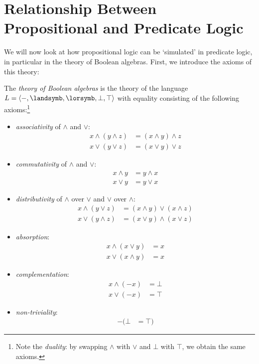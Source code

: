 \section{Relationship Between Propositional and Predicate Logic}
\label{section:relationship-propositional-predicate-logic}

We will now look at how propositional logic can be `simulated' in predicate logic, in particular in the theory of Boolean algebras. First, we introduce the axioms of this theory:

\begin{definition}
    The \emph{theory of Boolean algebras} is the theory of the language $L=\langle -,\landsymb,\lorsymb,\bot,\top\rangle$ with equality consisting of the following axioms:\footnote{Note the \emph{duality}: by swapping $\land$ with $\lor$ and $\bot$ with $\top$, we obtain the same axioms.}
    \begin{multicols}{2}
        \begin{itemize}
            \item \emph{associativity} of $\land$ and $\lor$:
            \begin{align*}
                x\land(y\land z) &=(x\land y)\land z\\
                x\lor(y\lor z) &=(x\lor y)\lor z
            \end{align*}
            \item \emph{commutativity} of $\land$ and $\lor$:
            \begin{align*}
                x\land y &= y\land x\\
                x\lor y &= y\lor x
            \end{align*}
            \item \emph{distributivity} of $\land$ over $\lor$ and $\lor$ over $\land$:
            \begin{align*}
                x\land(y\lor z) &= (x\land y)\lor (x\land z)\\
                x\lor(y\land z) &= (x\lor y)\land (x\lor z)
            \end{align*}
            \item \emph{absorption}:
            \begin{align*}
                x\land(x\lor y) &= x\\
                x\lor(x\land y) &= x
            \end{align*}
            \item \emph{complementation}:
            \begin{align*}
                x\land(-x) &= \bot \\
                x\lor(-x) &= \top
            \end{align*}
            \item \emph{non-triviality}:
            \begin{align*}
                - (\bot &= \top)
            \end{align*}

        \end{itemize}
    \end{multicols}    
\end{definition}

